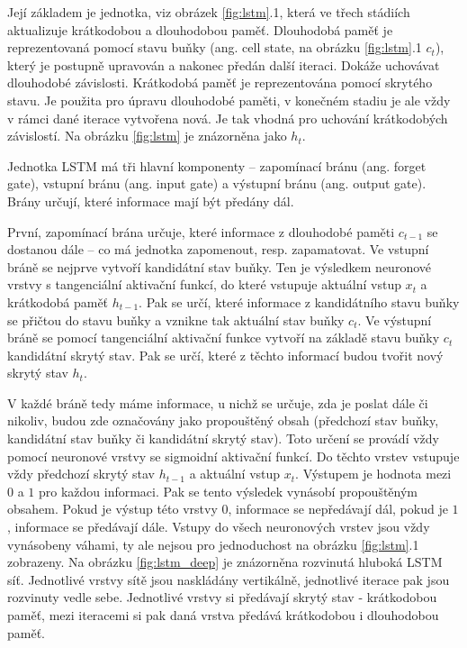 Její základem je jednotka, viz obrázek \ref{fig:lstm}.1, která ve třech
stádiích aktualizuje krátkodobou a dlouhodobou paměť. Dlouhodobá paměť je
reprezentovaná pomocí stavu buňky (ang. cell state, na obrázku \ref{fig:lstm}.1
$c_t$), který je postupně upravován a nakonec předán další iteraci. Dokáže
uchovávat dlouhodobé závislosti. Krátkodobá paměť je reprezentována pomocí
skrytého stavu. Je použita pro úpravu dlouhodobé paměti, v konečném stadiu je
ale vždy v rámci dané iterace vytvořena nová. Je tak vhodná pro uchování
krátkodobých závislostí. Na obrázku \ref{fig:lstm} je znázorněna jako $h_t$.

Jednotka LSTM má tři hlavní komponenty – zapomínací bránu (ang. forget gate),
vstupní bránu (ang. input gate) a výstupní bránu (ang. output gate). Brány
určují, které informace mají být předány dál.

První, zapomínací brána určuje, které informace z dlouhodobé paměti $c_{t-1}$
se dostanou dále – co má jednotka zapomenout, resp. zapamatovat. Ve vstupní
bráně se nejprve vytvoří kandidátní stav buňky. Ten je výsledkem neuronové
vrstvy s tangenciální aktivační funkcí, do které vstupuje aktuální vstup $x_t$
a krátkodobá paměť $h_{t-1}$. Pak se určí, které informace z kandidátního stavu
buňky se přičtou do stavu buňky a vznikne tak aktuální stav buňky $c_t$. Ve
výstupní bráně se pomocí tangenciální aktivační funkce vytvoří na základě stavu
buňky $c_t$ kandidátní skrytý stav. Pak se určí, které z těchto informací budou
tvořit nový skrytý stav $h_t$.

V každé bráně tedy máme informace, u nichž se určuje, zda je poslat dále či
nikoliv, budou zde označovány jako propouštěný obsah (předchozí stav buňky,
kandidátní stav buňky či kandidátní skrytý stav). Toto určení se provádí vždy
pomocí neuronové vrstvy se sigmoidní aktivační funkcí. Do těchto vrstev
vstupuje vždy předchozí skrytý stav $h_{t-1}$ a aktuální vstup $x_t$. Výstupem
je hodnota mezi $0$ a $1$ pro každou informaci. Pak se tento výsledek vynásobí
propouštěným obsahem. Pokud je výstup této vrstvy $0$, informace se nepředávají
dál, pokud je $1$, informace se předávají dále. Vstupy do všech neuronových
vrstev jsou vždy vynásobeny váhami, ty ale nejsou pro jednoduchost na obrázku
\ref{fig:lstm}.1 zobrazeny. Na obrázku \ref{fig:lstm_deep} je znázorněna
rozvinutá hluboká LSTM síť. Jednotlivé vrstvy sítě jsou naskládány vertikálně,
jednotlivé iterace pak jsou rozvinuty vedle sebe. Jednotlivé vrstvy si
předávají skrytý stav - krátkodobou paměť, mezi iteracemi si pak daná vrstva
předává krátkodobou i dlouhodobou paměť.

